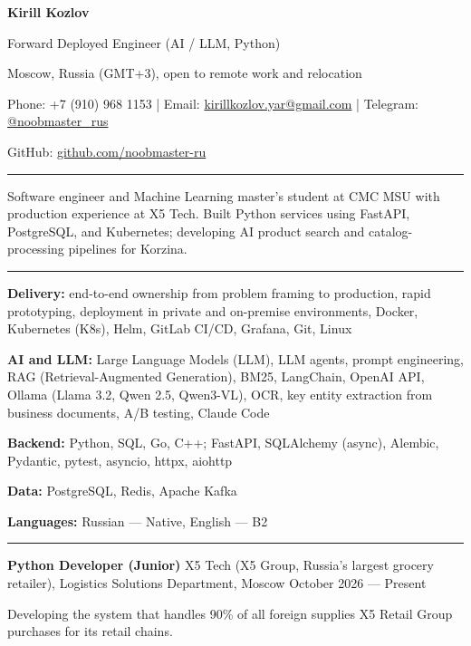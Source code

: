 \documentclass[10pt,a4paper]{article}
\newcommand{\cvsection}[1]{%
  \vspace{5pt}{\large\bfseries #1}\par\vspace{2pt}\hrule\vspace{3pt}}
\newcommand{\cventry}[3]{%
  \textbf{#1} \textbar{} #3 \textbar{} #2\par\vspace{1pt}}
\begin{document}
{\LARGE\bfseries Kirill Kozlov}\par\vspace{3pt}
Forward Deployed Engineer (AI / LLM, Python)\par\vspace{3pt}
Moscow, Russia (GMT+3), open to remote work and relocation\par
Phone: +7 (910) 968 1153 | Email: \href{mailto:kirillkozlov.yar@gmail.com}{kirillkozlov.yar@gmail.com} | Telegram: \href{https://t.me/noobmaster_rus}{@noobmaster\_rus}\par
GitHub: \href{https://github.com/noobmaster-ru}{github.com/noobmaster-ru}

\cvsection{Professional Summary}
Software engineer and Machine Learning master's student at CMC MSU with production experience at X5 Tech. Built Python services using FastAPI, PostgreSQL, and Kubernetes; developing AI product search and catalog-processing pipelines for Korzina.

\cvsection{Technical Skills}
\textbf{Delivery:} end-to-end ownership from problem framing to production, rapid prototyping, deployment in
private and on-premise environments, Docker, Kubernetes (K8s), Helm, GitLab CI/CD, Grafana, Git, Linux\par
\textbf{AI and LLM:} Large Language Models (LLM), LLM agents, prompt engineering, RAG (Retrieval-Augmented
Generation), BM25, LangChain, OpenAI API, Ollama (Llama 3.2, Qwen 2.5, Qwen3-VL), OCR, key entity extraction from business documents, A/B testing, Claude Code\par
\textbf{Backend:} Python, SQL, Go, C++; FastAPI, SQLAlchemy (async), Alembic, Pydantic, pytest, asyncio, httpx, aiohttp\par
\textbf{Data:} PostgreSQL, Redis, Apache Kafka\par
\textbf{Languages:} Russian --- Native, English --- B2

\cvsection{Work Experience}
\cventry{Python Developer (Junior)}{October 2026 --- Present}{X5 Tech (X5 Group, Russia's largest grocery retailer), Logistics Solutions Department, Moscow}
\begin{cvitems}
    \item Developing the system that handles 90\% of all foreign supplies X5 Retail Group purchases for its retail chains.
\end{cvitems}
\vspace{2pt}
\end{document}
